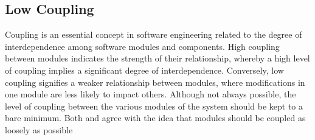 \subsection{Low Coupling} \label{subsec_on_coupling}

Coupling is an essential concept in software engineering related to the degree of
interdependence among software modules and components. High coupling between modules
indicates the strength of their relationship, whereby a high level of coupling implies a
significant degree of interdependence. Conversely, low coupling signifies a weaker
relationship between modules, where modifications in one module are less likely to impact
others. Although not always possible, the level of coupling between the various modules of
the system should be kept to a bare minimum. Both \textcite[23]{mannaert_normalized_2016}
and \textcite[130]{robert_c_martin_clean_2018} agree with the idea that modules should be
coupled as loosely as possible